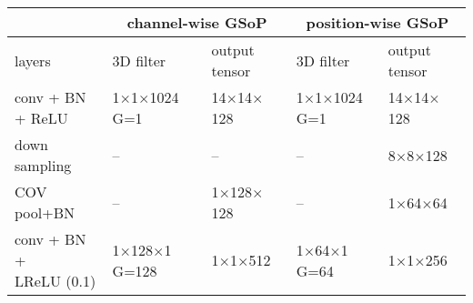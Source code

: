 \documentclass[10pt,twocolumn,letterpaper]{article}
\begin{document}
\begin{table}[t]
	\centering
	\setlength{\tabcolsep}{2pt}
	\footnotesize
	\renewcommand\arraystretch{1.3}
	\begin{tabular}{l|l|l|l|l}
		\hline 
		& \multicolumn{2}{|c|}{\parbox{1.22in}{\centering \vspace{1mm}channel-wise GSoP \vspace{1mm}}} & \multicolumn{2}{c}{\parbox{1.22in}{\centering \vspace{1mm}position-wise GSoP\vspace{1mm}}}\\
		\hline
		layers & 3D filter & output tensor  & 3D filter & output tensor\\
		\hline
		\parbox{0.5in}{\vspace{1mm} conv + BN\\ + ReLU\vspace{1mm}} & \parbox{0.5in}{1$\times$1$\times$1024\\G=1} & 14$\times$14$\times$128 & \parbox{0.5in}{1$\times$1$\times$1024\\G=1} & 14$\times$14$\times$128 \\
		\hline
		\parbox{0.7in}{\vspace{1mm}down sampling\vspace{1mm}} & \parbox{0.5in}{\centering --} & \parbox{0.5in}{\centering --}  & \parbox{0.5in}{\centering --} & 8$\times$8$\times$128\\
		\hline
		COV pool+BN & \parbox{0.5in}{\centering --} & \parbox{0.5in}{\vspace{1mm}{\color{graycolor}{128$\times$128$\rightarrow$}} \\ 1$\times$128$\times$128\vspace{1mm}} & \parbox{0.5in}{\centering --} &  \parbox{0.5in}{\vspace{1mm}{\color{graycolor}{64$\times$64$\rightarrow$}} \\ 1$\times$64$\times$64\vspace{1mm}}\\
		\hline
		\parbox{0.6in}{conv + BN + \\ LReLU (0.1)} & \parbox{0.55in}{\vspace{1mm}1$\times$128$\times $1\\G=128\vspace{1mm}} & 1$\times$1$\times$512 & \parbox{0.55in}{\vspace{1mm}1$\times $64$\times$1 \\ G=64\vspace{1mm}} & 1$\times$1$\times$256 \\ 

\end{tabular}
\end{table}
\end{document}
